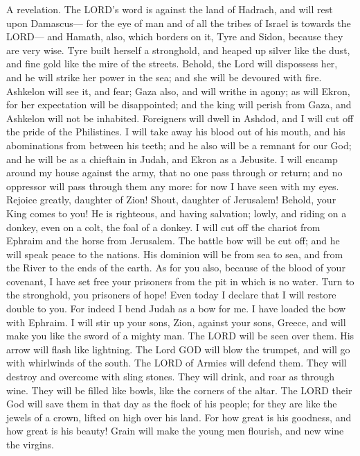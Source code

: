 A revelation. The LORD's word is against the land of
Hadrach, and will rest upon Damascus--- for the eye of man and of all
the tribes of Israel is towards the LORD---  and Hamath,
also, which borders on it, Tyre and Sidon, because they are very wise.
 Tyre built herself a stronghold, and heaped up silver like
the dust, and fine gold like the mire of the streets. 
Behold, the Lord will dispossess her, and he will strike her power in
the sea; and she will be devoured with fire.  Ashkelon will
see it, and fear; Gaza also, and will writhe in agony; as will Ekron,
for her expectation will be disappointed; and the king will perish from
Gaza, and Ashkelon will not be inhabited.  Foreigners will
dwell in Ashdod, and I will cut off the pride of the Philistines.
 I will take away his blood out of his mouth, and his
abominations from between his teeth; and he also will be a remnant for
our God; and he will be as a chieftain in Judah, and Ekron as a
Jebusite.  I will encamp around my house against the army,
that no one pass through or return; and no oppressor will pass through
them any more: for now I have seen with my eyes.  Rejoice
greatly, daughter of Zion! Shout, daughter of Jerusalem! Behold, your
King comes to you! He is righteous, and having salvation; lowly, and
riding on a donkey, even on a colt, the foal of a donkey. 
I will cut off the chariot from Ephraim and the horse from Jerusalem.
The battle bow will be cut off; and he will speak peace to the nations.
His dominion will be from sea to sea, and from the River to the ends of
the earth.  As for you also, because of the blood of your
covenant, I have set free your prisoners from the pit in which is no
water.  Turn to the stronghold, you prisoners of hope! Even
today I declare that I will restore double to you.  For
indeed I bend Judah as a bow for me. I have loaded the bow with Ephraim.
I will stir up your sons, Zion, against your sons, Greece, and will make
you like the sword of a mighty man.  The LORD will be seen
over them. His arrow will flash like lightning. The Lord GOD will blow
the trumpet, and will go with whirlwinds of the south.  The
LORD of Armies will defend them. They will destroy and overcome with
sling stones. They will drink, and roar as through wine. They will be
filled like bowls, like the corners of the altar.  The LORD
their God will save them in that day as the flock of his people; for
they are like the jewels of a crown, lifted on high over his land.
 For how great is his goodness, and how great is his
beauty! Grain will make the young men flourish, and new wine the
virgins.

